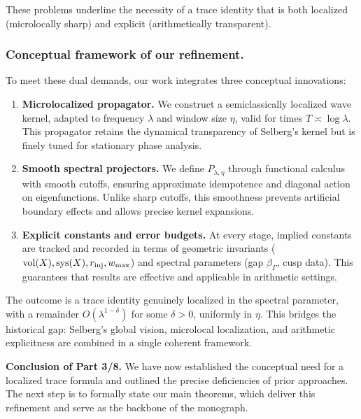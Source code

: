 These problems underline the necessity of a trace identity that is both
localized (microlocally sharp) and explicit (arithmetically transparent).

\subsubsection*{Conceptual framework of our refinement.}
To meet these dual demands, our work integrates three conceptual innovations:

\begin{enumerate}[label=\Alph*.]
  \item \textbf{Microlocalized propagator.} We construct a semiclassically
  localized wave kernel, adapted to frequency $\lambda$ and window size $\eta$,
  valid for times $T\asymp\log\lambda$. This propagator retains the dynamical
  transparency of Selberg’s kernel but is finely tuned for stationary phase
  analysis.

  \item \textbf{Smooth spectral projectors.} We define $P_{\lambda,\eta}$
  through functional calculus with smooth cutoffs, ensuring approximate
  idempotence and diagonal action on eigenfunctions. Unlike sharp cutoffs, this
  smoothness prevents artificial boundary effects and allows precise kernel
  expansions.

  \item \textbf{Explicit constants and error budgets.} At every stage, implied
  constants are tracked and recorded in terms of geometric invariants
  ($\operatorname{vol}(X),\mathrm{sys}(X),r_{\mathrm{inj}},w_{\max}$) and spectral parameters
  (gap $\beta_\Gamma$, cusp data). This guarantees that results are effective
  and applicable in arithmetic settings.
\end{enumerate}

The outcome is a trace identity genuinely localized in the spectral parameter,
with a remainder $O(\lambda^{1-\delta})$ for some $\delta>0$, uniformly in
$\eta$. This bridges the historical gap: Selberg’s global vision, microlocal
localization, and arithmetic explicitness are combined in a single coherent
framework.

\medskip

\noindent\textbf{Conclusion of Part 3/8.}
We have now established the conceptual need for a localized trace formula and
outlined the precise deficiencies of prior approaches. The next step is to
formally state our main theorems, which deliver this refinement and serve as
the backbone of the monograph.

